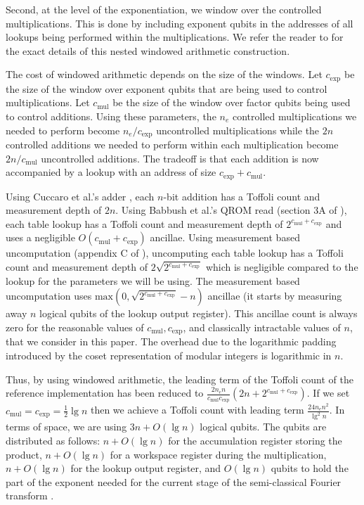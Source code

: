 \documentclass[superscriptaddress,notitlepage,longbibliography]{revtex4-1}
\theoremstyle{definition}
\theoremstyle{definition}
\newcommand{\lenexp}{{n_e}}
\newcommand{\gexp}{{c_{\text{exp}}}}
\newcommand{\gmul}{{c_{\text{mul}}}}
\begin{document}
Second, at the level of the exponentiation, we window over the controlled multiplications.
This is done by including exponent qubits in the addresses of all lookups being performed within the multiplications.
We refer the reader to \cite{gidney2019windowedarithmetic} for the exact details of this nested windowed arithmetic construction.

The cost of windowed arithmetic depends on the size of the windows.
Let $\gexp$ be the size of the window over exponent qubits that are being used to control multiplications.
Let $\gmul$ be the size of the window over factor qubits being used to control additions.
Using these parameters, the $\lenexp$ controlled multiplications we needed to perform become $\lenexp / \gexp$ uncontrolled multiplications while the $2 n$ controlled additions we needed to perform within each multiplication become $2 n / \gmul$ uncontrolled additions.
The tradeoff is that each addition is now accompanied by a lookup with an address of size $\gexp + \gmul$.

Using Cuccaro et al.'s adder \cite{cuccaro2004adder}, each $n$-bit addition has a Toffoli count and measurement depth of $2n$.
Using Babbush et al.'s QROM read (section 3A of \cite{babbush2018}), each table lookup has a Toffoli count and measurement depth of $2^{\gmul+\gexp}$ and uses a negligible $O(\gmul + \gexp)$ ancillae.
Using measurement based uncomputation (appendix C of \cite{berry2019qubitization}), uncomputing each table lookup has a Toffoli count and measurement depth of $2 \sqrt{2^{\gmul + \gexp}}$ which is negligible compared to the lookup for the parameters we will be using.
The measurement based uncomputation uses $\text{max}(0, \sqrt{2^{\gmul + \gexp}} - n)$ ancillae (it starts by measuring away $n$ logical qubits of the lookup output register).
This ancillae count is always zero for the reasonable values of $\gmul, \gexp$, and classically intractable values of $n$, that we consider in this paper.
The overhead due to the logarithmic padding introduced by the coset representation of modular integers is logarithmic in $n$.

Thus, by using windowed arithmetic, the leading term of the Toffoli count of the reference implementation has been reduced to $\frac{2 \lenexp n}{\gmul \gexp} (2n + 2^{\gmul + \gexp})$.
If we set $\gmul = \gexp = \frac{1}{2} \lg n$ then we achieve a Toffoli count with leading term $\frac{24 \lenexp n^2}{\lg^2 n}$.
In terms of space, we are using $3n + O(\lg n)$ logical qubits.
The qubits are distributed as follows:
  $n+O(\lg n)$ for the accumulation register storing the product,
  $n+O(\lg n)$ for a workspace register during the multiplication,
  $n + O(\lg n)$ for the lookup output register,
  and $O(\lg n)$ qubits to hold the part of the exponent needed for the current stage of the semi-classical Fourier transform \cite{griffiths1996semiclassical}.
\end{document}
